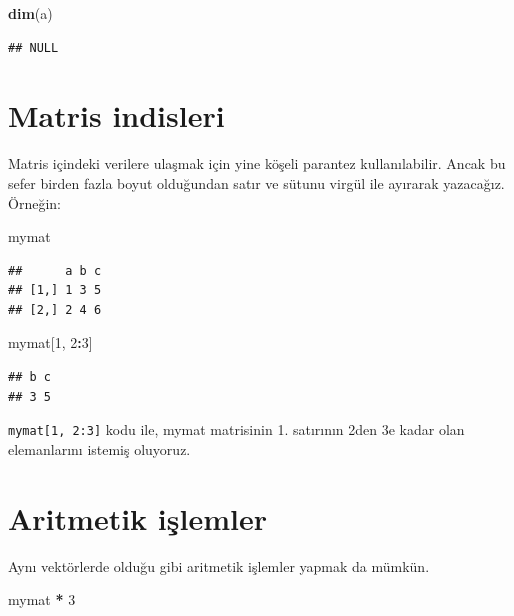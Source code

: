 \documentclass[]{book}
\newenvironment{Shaded}{\begin{snugshade}}{\end{snugshade}}
\newcommand{\DecValTok}[1]{\textcolor[rgb]{0.00,0.00,0.81}{#1}}
\newcommand{\KeywordTok}[1]{\textcolor[rgb]{0.13,0.29,0.53}{\textbf{#1}}}
\newcommand{\NormalTok}[1]{#1}
\newcommand{\OperatorTok}[1]{\textcolor[rgb]{0.81,0.36,0.00}{\textbf{#1}}}
\newcommand{\StringTok}[1]{\textcolor[rgb]{0.31,0.60,0.02}{#1}}
\begin{document}
\begin{Shaded}
\begin{Highlighting}[]
\KeywordTok{dim}\NormalTok{(a)}
\end{Highlighting}
\end{Shaded}

\begin{verbatim}
## NULL
\end{verbatim}

\hypertarget{matris-indisleri}{%
\section{Matris indisleri}\label{matris-indisleri}}

Matris içindeki verilere ulaşmak için yine köşeli parantez
kullanılabilir. Ancak bu sefer birden fazla boyut olduğundan satır ve
sütunu virgül ile ayırarak yazacağız. Örneğin:

\begin{Shaded}
\begin{Highlighting}[]
\NormalTok{mymat}
\end{Highlighting}
\end{Shaded}

\begin{verbatim}
##      a b c
## [1,] 1 3 5
## [2,] 2 4 6
\end{verbatim}

\begin{Shaded}
\begin{Highlighting}[]
\NormalTok{mymat[}\DecValTok{1}\NormalTok{, }\DecValTok{2}\OperatorTok{:}\DecValTok{3}\NormalTok{]}
\end{Highlighting}
\end{Shaded}

\begin{verbatim}
## b c 
## 3 5
\end{verbatim}

\texttt{mymat{[}1,\ 2:3{]}} kodu ile, mymat matrisinin 1. satırının 2den
3e kadar olan elemanlarını istemiş oluyoruz.

\hypertarget{aritmetik-islemler}{%
\section{Aritmetik işlemler}\label{aritmetik-islemler}}

Aynı vektörlerde olduğu gibi aritmetik işlemler yapmak da mümkün.

\begin{Shaded}
\begin{Highlighting}[]
\NormalTok{mymat }\OperatorTok{*}\StringTok{ }\DecValTok{3}
\end{Highlighting}
\end{Shaded}
\end{document}
